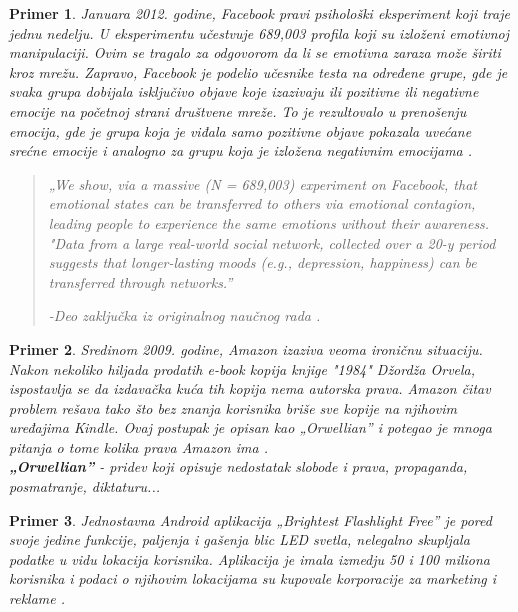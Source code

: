 \documentclass[a4paper]{article}
\newtheorem{primer}{Primer}[section]
\begin{document}
\begin{primer}
	Januara 2012. godine, Facebook pravi psihološki eksperiment koji 
traje jednu nedelju. U eksperimentu učestvuje 689,003 profila koji su izloženi emotivnoj manipulaciji. Ovim se tragalo za odgovorom da li se emotivna zaraza može širiti kroz mrežu. Zapravo, Facebook je podelio učesnike testa na određene grupe, gde je svaka grupa dobijala isključivo objave koje izazivaju ili pozitivne ili negativne emocije na početnoj strani društvene mreže. To je rezultovalo u prenošenju emocija, gde je grupa koja je viđala samo pozitivne objave pokazala uvećane srećne emocije i analogno 	za grupu koja je izložena negativnim emocijama \cite{facebookExperiment}.
\begin{quotation}
	\textit{„We show, via a massive (N = 689,003) experiment on Facebook, that emotional states can be transferred to others via emotional contagion, leading people to experience the same emotions without their awareness.
"Data from a large real-world social network, collected over a 20-y period suggests that longer-lasting moods (e.g., depression, happiness) can be transferred through networks.”}
\begin{flushright}
-\em{Deo zaključka iz originalnog naučnog rada \cite{facebookExperiment}.}
\end{flushright}
\end{quotation}
\end{primer}

\begin{primer}
	Sredinom 2009. godine, Amazon izaziva veoma ironičnu 
situaciju. Nakon nekoliko hiljada prodatih e-book kopija knjige "1984" Džordža Orvela, ispostavlja se da izdavačka kuća tih kopija nema autorska prava. Amazon čitav problem rešava tako što bez znanja korisnika briše sve kopije na njihovim uređajima Kindle. Ovaj postupak je opisan kao „Orwellian” i potegao je mnoga pitanja o tome kolika prava Amazon ima \cite{dataAndGoliath}. \\
\textbf{„Orwellian”} - \textit{pridev koji opisuje nedostatak slobode i prava, propaganda, posmatranje, diktaturu...}\\
\end{primer}

\begin{primer}
	Jednostavna Android aplikacija „Brightest Flashlight 
Free” je pored svoje jedine funkcije, paljenja i gašenja blic LED svetla, nelegalno skupljala podatke u vidu lokacija korisnika. Aplikacija je imala izmedju 50 i 100 miliona korisnika i podaci o njihovim lokacijama su kupovale korporacije za marketing i reklame \cite{dataAndGoliath}\cite{flashlightApp}.\\
\end{primer}
\end{document}

